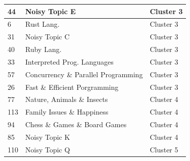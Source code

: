 \documentclass[11pt,journal,final,a4paper]{IEEEtran}
\begin{document}
\begin{table}[!ht]
\begin{tabular}{lll}
44                                                 & Noisy Topic E                                                                                                & Cluster 3    \\ \hline
6                                                  & Rust Lang.                                                                                                   & Cluster 3    \\ \hline
31                                                 & Noisy Topic C                                                                                                & Cluster 3    \\ \hline
40                                                 & Ruby Lang.                                                                                                   & Cluster 3    \\ \hline
33                                                 & Interpreted Prog. Languages                                                                                  & Cluster 3    \\ \hline
57                                                 & Concurrency \& Parallel Programming                                                                          & Cluster 3    \\ \hline
26                                                 & Fast \& Efficient Porgramming                                                                                & Cluster 3    \\ \hline
77                                                 & Nature, Animals \& Insects                                                                                   & Cluster 4    \\ \hline
113                                                & Family Issues \& Happiness                                                                                   & Cluster 4    \\ \hline
94                                                 & Chess \& Games \& Board Games                                                                                & Cluster 4    \\ \hline
85                                                 & Noisy Topic K                                                                                                & Cluster 4    \\ \hline
110                                                & Noisy Topic Q                                                                                                & Cluster 5    \\ \hline

\end{tabular}
\end{table}
\end{document}
